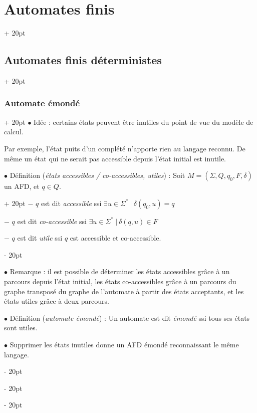 \documentclass[a4paper, 12pt, twoside]{article}
\newcommand{\ind}[1][20pt]{\advance\leftskip + #1}
\newcommand{\deind}[1][20pt]{\advance\leftskip - #1}
\newenvironment{indt}[2][20pt]{#2 \par \ind[#1]}{\par \deind} %
\begin{document}
\begin{indt}{\section{Automates finis}}
\begin{indt}{\subsection{Automates finis déterministes}}
            \vspace{12pt}
            
            \begin{indt}{\subsubsection{Automate émondé}}
                $\bullet$ Idée : certains états peuvent être inutiles du point de vue du modèle de calcul.

                Par exemple, l'état puits d'un complété n'apporte rien au langage reconnu.
                De même un état qui ne serait pas accessible depuis l'état initial est inutile.

                \vspace{12pt}
                
                \begin{indt}{$\bullet$ Définition (\emph{états accessibles / co-accessibles, utiles}) : Soit $M = (\Sigma, Q, q_0, F, \delta)$ un AFD, et $q \in Q$.}
                    $-$ $q$ est dit \emph{accessible} ssi $\exists u \in \Sigma^*\ |\ \delta(q_0, u) = q$

                    $-$ $q$ est dit \emph{co-accessible} ssi $\exists u \in \Sigma^*\ |\ \delta(q, u) \in F$

                    $-$ $q$ est dit \emph{utile} ssi $q$ est accessible et co-accessible.
                \end{indt}

                \vspace{12pt}
                
                $\bullet$ Remarque : il est possible de déterminer les états accessibles grâce à un parcours depuis l'état initial, les états co-accessibles grâce à un parcours du graphe transposé du graphe de l'automate à partir des états acceptants, et les états utiles grâce à deux parcours.

                \vspace{12pt}
                
                $\bullet$ Définition (\emph{automate émondé}) : Un automate est dit \emph{émondé} ssi tous ses états sont utiles.

                \vspace{12pt}
                
                $\bullet$  Supprimer les états inutiles donne un AFD émondé reconnaissant le même langage.


\end{indt}
\end{indt}
\end{indt}
\end{document}
